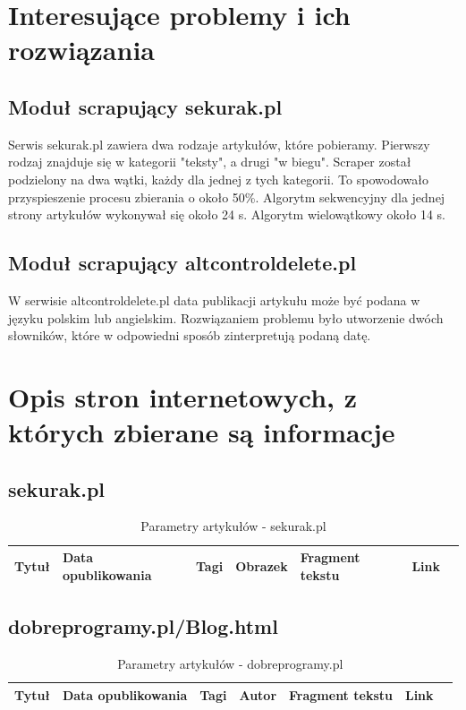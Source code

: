 \documentclass[12pt, titlepage]{article}
\begin{document}
	\section{Interesujące problemy i ich rozwiązania}
		\subsection{Moduł scrapujący sekurak.pl}
			Serwis sekurak.pl zawiera dwa rodzaje artykułów, które pobieramy. Pierwszy rodzaj znajduje się w kategorii "teksty", a drugi "w biegu". Scraper został podzielony na dwa wątki, każdy dla jednej z tych kategorii. To spowodowało przyspieszenie procesu zbierania o około 50\%. Algorytm sekwencyjny dla jednej strony artykułów wykonywał się około 24 s. Algorytm wielowątkowy około 14 s.
		\subsection{Moduł scrapujący altcontroldelete.pl}
			W serwisie altcontroldelete.pl data publikacji artykułu może być podana w języku polskim lub angielskim. Rozwiązaniem problemu było utworzenie dwóch słowników, które w odpowiedni sposób zinterpretują podaną datę. 
	\newpage
	\section{Opis stron internetowych, z których zbierane są informacje}
		\subsection{sekurak.pl}
		\begin{table}[H]
			\centering
			\caption{Parametry artykułów - sekurak.pl}
			\label{sekurak_parametry}
			\begin{tabular}{ | C{2cm} | C{4cm} | C{2cm} | C{2cm} | C{3cm} | C{2cm} | @{}m{0pt}@{}}
				\hline
				Tytuł & Data opublikowania & Tagi & Obrazek & Fragment tekstu & Link &\\[0.5cm]
				\hline
			\end{tabular}
		\end{table}

		\subsection{dobreprogramy.pl/Blog.html} 
		\begin{table}[H]
			\centering
			\caption{Parametry artykułów - dobreprogramy.pl}
			\label{dobreprogramy_parametry}
			\begin{tabular}{ | C{2cm} | C{4cm} | C{2cm} | C{2cm} | C{3cm} | C{2cm} | @{}m{0pt}@{}}
				\hline
				Tytuł & Data opublikowania & Tagi & Autor & Fragment tekstu & Link &\\[0.5cm]
				\hline
			\end{tabular}
		\end{table}
\end{document}
